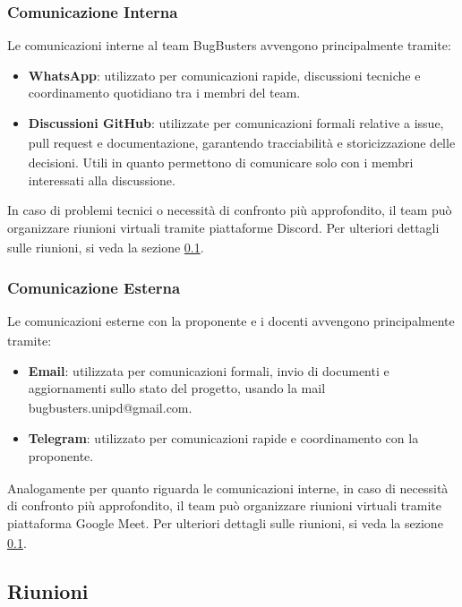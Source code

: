 \documentclass[a4paper,11pt]{article}
\newcommand{\G}{\textsubscript{\scalebox{0.6}{\textbf{G}}}}
\begin{document}
\subsubsection{Comunicazione Interna}
Le comunicazioni interne al team BugBusters avvengono principalmente tramite:
\begin{itemize}
    \item \textbf{WhatsApp}: utilizzato per comunicazioni rapide, discussioni tecniche e coordinamento quotidiano tra i membri del team.
    \item \textbf{Discussioni GitHub\G{}}: utilizzate per comunicazioni formali relative a issue\G{}, pull request e documentazione, 
    garantendo tracciabilità\G{} e storicizzazione delle decisioni. Utili in quanto permettono di comunicare solo con i membri interessati alla discussione.
\end{itemize}
In caso di problemi tecnici o necessità di confronto più approfondito, il team può organizzare riunioni virtuali tramite piattaforme Discord\G{}.
Per ulteriori dettagli sulle riunioni, si veda la sezione \ref{riunioni}.

\subsubsection{Comunicazione Esterna}
Le comunicazioni esterne con la proponente\G{} e i docenti avvengono principalmente tramite:
\begin{itemize}
    \item \textbf{Email}: utilizzata per comunicazioni formali, invio di documenti e aggiornamenti sullo stato del progetto\G{}, 
    usando la mail bugbusters.unipd@gmail.com.
    \item \textbf{Telegram}: utilizzato per comunicazioni rapide e coordinamento con la proponente\G{}.
\end{itemize}
Analogamente per quanto riguarda le comunicazioni interne, in caso 
di necessità di confronto più approfondito, il team può organizzare riunioni virtuali tramite piattaforma Google Meet\G{}.
Per ulteriori dettagli sulle riunioni, si veda la sezione \ref{riunioni}.

\subsection{Riunioni}\label{riunioni}
\end{document}
